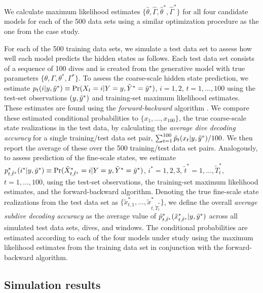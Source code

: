 We calculate maximum likelihood estimates $\{\hat \theta, \hat \Gamma, \hat \theta^*, \hat \Gamma^*\}$ for all four candidate models for each of the 500 data sets using a similar optimization procedure as the one from the case study. %

For each of the 500 training data sets, we simulate a test data set to assess how well each model predicts the hidden states as follows.
Each test data set consists of a sequence of 100 dives and is created from the generative model with true parameters $\{\theta, \Gamma, \theta^*, \Gamma^*\}$.
To assess the coarse-scale hidden state prediction, we estimate $p_t(i|y,\tilde{y}^*) \equiv \Pr(X_t=i|Y=y,\tilde{Y}^*=\tilde{y}^*)$, $i=1,2$, $t=1,\ldots,100$ using the test-set observations $(y,\tilde{y}^*)$ and training-set maximum likelihood estimates. These estimates are found using the {\em{forward-backward}} algorithm \citep{Zucchini:2016}. We compare these estimated conditional probabilities to $\{x_1,\ldots,x_{100}\}$, the true coarse-scale state realizations in the test data, by calculating the {\em{average dive decoding accuracy}} for a single training/test data set pair, $\sum_{t=1}^{100} \hat{p}_t(x_t|y,\tilde{y}^*)/100$. We then report the average of these over the 500 training/test data set pairs. 
Analogously, to assess prediction of the fine-scale states, we estimate $p^*_{t,\tilde t^*}(i^*|y,\tilde{y}^*) \equiv \Pr(\tilde X^*_{t,\tilde t^*}=i|Y=y,\tilde{Y}^*=\tilde{y}^*)$, $i^*=1,2,3$, $\tilde t^* = 1,\ldots,\tilde T^*_t$, $t=1,\ldots,100$, using the test-set observations, the training-set maximum likelihood estimates, and the forward-backward algorithm. Denoting the true fine-scale state realizations from the test data set as $\{\tilde x^*_{t,1},\ldots,\tilde x^*_{t,\tilde T^*_t}\}$, we define the overall \textit{average subdive decoding accuracy} as the average value of $\hat{p}^*_{t,\tilde t^*}(\tilde x^*_{t,\tilde t^*}|y,\tilde{y}^*)$ across all simulated test data sets, dives, and windows. The conditional probabilities are estimated according to each of the four models under study using the maximum likelihood estimates from the training data set in conjunction with the forward-backward algorithm.

\subsection{Simulation results}

